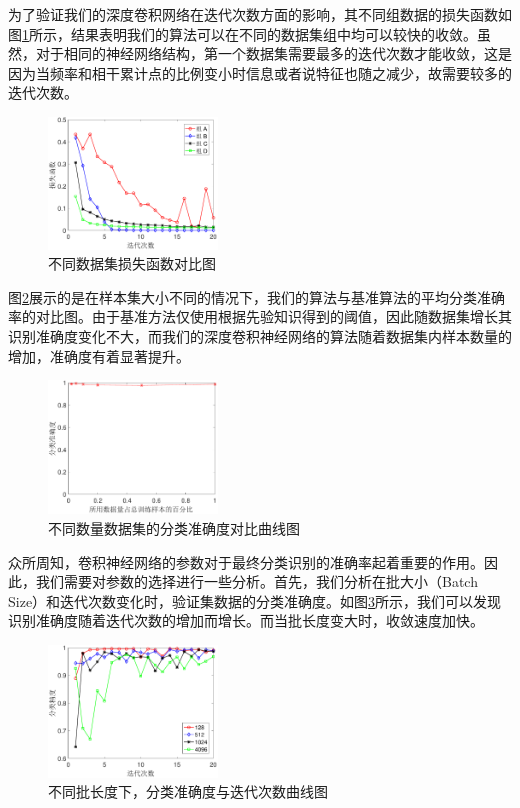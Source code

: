 为了验证我们的深度卷积网络在迭代次数方面的影响，其不同组数据的损失函数如图\ref{fig:group_results}所示，结果表明我们的算法可以在不同的数据集组中均可以较快的收敛。虽然，对于相同的神经网络结构，第一个数据集需要最多的迭代次数才能收敛，这是因为当频率和相干累计点的比例变小时信息或者说特征也随之减少，故需要较多的迭代次数。
\begin{figure}[H]
	\centering
	\includegraphics[width=0.4\textwidth]{figures/othr/group_results}
	\caption{不同数据集损失函数对比图}
	\label{fig:group_results}
\end{figure}

图\ref{fig:sizes}展示的是在样本集大小不同的情况下，我们的算法与基准算法的平均分类准确率的对比图。由于基准方法仅使用根据先验知识得到的阈值，因此随数据集增长其识别准确度变化不大，而我们的深度卷积神经网络的算法随着数据集内样本数量的增加，准确度有着显著提升。
\begin{figure}[H]
	\centering
	\includegraphics[width=0.4\textwidth]{figures/othr/sizes}
	\caption{不同数量数据集的分类准确度对比曲线图}
	\label{fig:sizes}
\end{figure}

众所周知，卷积神经网络的参数对于最终分类识别的准确率起着重要的作用。因此，我们需要对参数的选择进行一些分析。首先，我们分析在批大小（Batch Size）和迭代次数变化时，验证集数据的分类准确度。如图\ref{fig:epoch}所示，我们可以发现识别准确度随着迭代次数的增加而增长。而当批长度变大时，收敛速度加快。
\begin{figure}[H]
	\centering
	\includegraphics[width=0.4\textwidth]{figures/othr/epoch}
	\caption{不同批长度下，分类准确度与迭代次数曲线图}
	\label{fig:epoch}
\end{figure}

